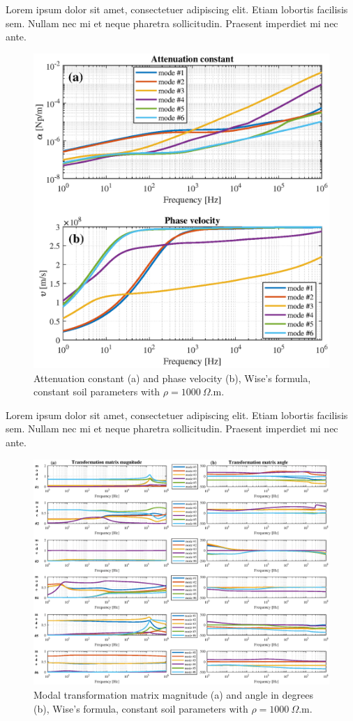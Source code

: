 \documentclass[lettersize,journal]{IEEEtran}
\newcommand*{\shortblindtext}{Lorem ipsum dolor sit amet, consectetuer adipiscing elit. Etiam lobortis facilisis sem. Nullam nec mi et neque pharetra sollicitudin. Praesent imperdiet mi nec ante.}
\begin{document}
\shortblindtext
\begin{figure}[tbh]
	\centering
	\label{fig:AtnConst_PhaseVel_FD0_Ztot_Wise_Ytot_Wise_rho1000_eps5}
	\includegraphics[width=1\columnwidth]{./fig/AtnConst_PhaseVel_FD0_Ztot_Wise_Ytot_Wise_rho1000_eps5.eps}
	\caption{Attenuation constant (a) and phase velocity (b), Wise's formula, constant soil parameters with $\rho = 1000 \: \Omega$.m.}
\end{figure}

\shortblindtext
\onecolumn
\begin{figure}[tbh]
	\centering
	\label{fig:TransfMat_FD0_Ztot_Wise_Ytot_Wise_rho1000_eps5}
	\includegraphics[width=1\columnwidth]{./fig/TransfMat_FD0_Ztot_Wise_Ytot_Wise_rho1000_eps5.eps}
	\caption{Modal transformation matrix magnitude  (a) and angle in degrees (b), Wise's formula, constant soil parameters with $\rho = 1000 \: \Omega$.m.}
\end{figure}
\twocolumn
\end{document}
